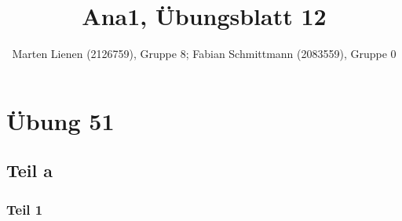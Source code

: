 \documentclass[a4paper,10pt]{article}
\title{Ana1, Übungsblatt 12}
\author{Marten Lienen (2126759), Gruppe 8; Fabian Schmittmann (2083559), Gruppe 0}
\begin{document}
\maketitle

\section*{Übung 51}

\subsection*{Teil a}

\subsubsection*{Teil 1}
\end{document}
